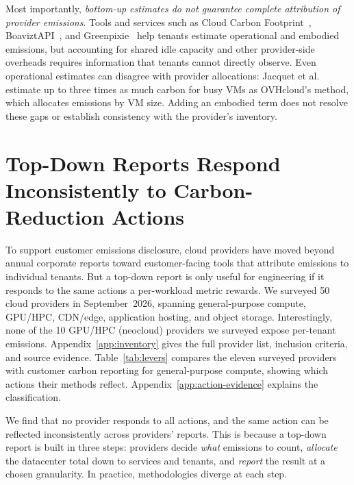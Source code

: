 \documentclass[sigconf,screen,nonacm]{acmart}
\begin{document}
Most importantly, \emph{bottom-up estimates do not guarantee complete attribution of provider emissions}.
Tools and services such as Cloud Carbon Footprint~\cite{cloudcarbonfootprint}, BoaviztAPI~\cite{simon2024boaviztapi}, and Greenpixie~\cite{greenpixie-cloud-methodology} help tenants estimate operational and embodied emissions, but accounting for shared idle capacity and other provider-side overheads requires information that tenants cannot directly observe.
Even operational estimates can disagree with provider allocations: Jacquet et al.~\cite{jacquet2025cinergy} estimate up to three times as much carbon for busy VMs as OVHcloud's method, which allocates emissions by VM size.
Adding an embodied term does not resolve these gaps or establish consistency with the provider's inventory.

\section{Top-Down Reports Respond Inconsistently to Carbon-Reduction Actions}
\label{sec:sota}

To support customer emissions disclosure, cloud providers have moved beyond annual corporate reports toward customer-facing tools that attribute emissions to individual tenants.
But a top-down report is only useful for engineering if it responds to the same actions a per-workload metric rewards.
We surveyed 50 cloud providers in September~2026, spanning general-purpose compute, GPU/HPC, CDN/edge, application hosting, and object storage.
Interestingly, none of the 10 GPU/HPC (neocloud) providers we surveyed expose per-tenant emissions.
Appendix~\ref{app:inventory} gives the full provider list, inclusion criteria, and source evidence.
Table~\ref{tab:levers} compares the eleven surveyed providers with customer carbon reporting for general-purpose compute, showing which actions their methods reflect.
Appendix~\ref{app:action-evidence} explains the classification.

We find that no provider responds to all actions, and the same action can be reflected inconsistently across providers’ reports.
This is because a top-down report is built in three steps: providers decide \emph{what} emissions to count, \emph{allocate} the datacenter total down to services and tenants, and \emph{report} the result at a chosen granularity.
In practice, methodologies diverge at each step.
\end{document}

